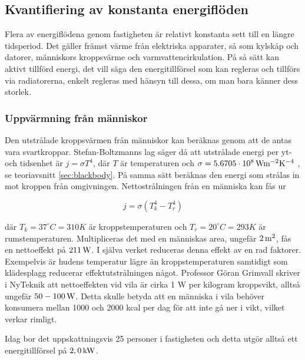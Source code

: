 \subsection{Kvantifiering av konstanta energiflöden}


Flera av energiflödena genom fastigheten är relativt konstanta sett till en längre tidsperiod. Det gäller främst värme från elektriska apparater, så som kylskåp och datorer, människors kroppsvärme och varmvattencirkulation. På så sätt kan aktivt tillförd energi, det vill säga den energitillförsel som kan regleras och tillförs via radiatorerna, enkelt regleras med hänsyn till dessa, om man bara känner dess storlek.

\subsubsection{Uppvärmning från människor}
Den utstrålade kroppsvärmen från människor kan beräknas genom att de antas vara svartkroppar. Stefan-Boltzmanns lag säger då att utstrålade energi per yt- och tidsenhet är $j=\sigma T^4$, där $T$ är temperaturen och $\sigma=\unit[5.6705\cdot 10^8]{Wm^{-2}K^{-4}}$ \cite{physicshandbook}, se teoriavsnitt \ref{sec:blackbody}. På samma sätt beräknas den energi som strålas in mot kroppen från omgivningen. Nettostrålningen från en människa kan fås ur

\begin{equation}
\label{eq:constantsources:stefan}
j=\sigma \left( T_k^4 - T_r^4 \right)
\end{equation}
\noindent

där $T_k=37^{\circ}C=310K$ är kroppstemperaturen och $T_r=20^{\circ}C=293K$ är rumstemperaturen. Multipliceras det med en människas area, ungefär $\unit[2]{m^2}$, fås en nettoeffekt på $\unit[211]{W}$. I själva verket reduceras denna effekt av en rad faktorer. Exempelvis är hudens temperatur lägre än kroppstemperaturen samtidigt som klädesplagg reducerar effektutstrålningen något. Professor Göran Grimvall skriver i NyTeknik att nettoeffekten vid vila är cirka 1 W per kilogram kroppsvikt, alltså ungefär $\unit[50-100]{W}$\cite{Grimvall}. Detta skulle betyda att en människa i vila behöver konsumera mellan 1000 och 2000 kcal per dag för att inte gå ner i vikt, vilket verkar rimligt.

Idag bor det uppskattningsvis 25 personer i fastigheten och detta utgör alltså ett energitillförsel på $\unit[2,0]{kW}$.

